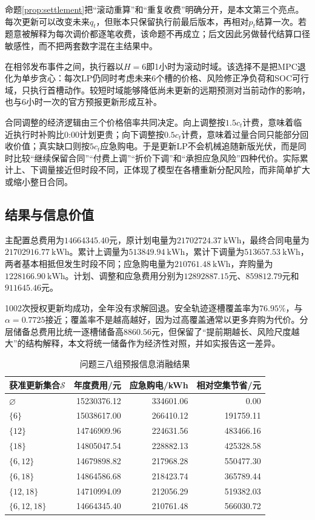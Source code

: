 \documentclass[UTF8,12pt,a4paper]{ctexart}
\theoremstyle{remark}
\begin{document}
命题\ref{prop:settlement}把“滚动重算”和“重复收费”明确分开，是本文第三个亮点。每次更新可以改变未来$q_t$，但账本只保留执行前最后版本，再相对$p_t$结算一次。若题意被解释为每次调价都逐笔收费，该命题不再成立；后文因此另做替代结算口径敏感性，而不把两套数字混在主结果中。

在相邻发布事件之间，执行器以$H=6$即1小时为滚动时域。该选择不是把MPC退化为单步贪心：每次LP仍同时考虑未来6个槽的价格、风险修正净负荷和SOC可行域，只执行首槽动作。较短时域能够降低尚未更新的远期预测对当前动作的影响，也与6小时一次的官方预报更新形成互补。

合同调整的经济逻辑由三个价格倍率共同决定。向上调整按$1.5c_t$计费，意味着临近执行时补购比0:00计划更贵；向下调整按$0.5c_t$计费，意味着过量合同只能部分回收价值；真实缺口则按$5c_t$应急购电。于是更新LP不会机械追随新版光伏，而是同时比较“继续保留合同”“付费上调”“折价下调”和“承担应急风险”四种代价。实际累计上、下调量接近但时段不同，正体现了模型在各槽重新分配风险，而非简单扩大或缩小整日合同。

\subsection{结果与信息价值}
主配置总费用为$14664345.40$元，原计划电量为$21702724.37\ \mathrm{kWh}$，最终合同电量为$21702916.77\ \mathrm{kWh}$。累计上调量为$513849.94\ \mathrm{kWh}$，累计下调量为$513657.53\ \mathrm{kWh}$，两者基本相抵但发生时段不同；应急购电量为$210761.48\ \mathrm{kWh}$，弃购量为$1228166.90\ \mathrm{kWh}$。计划、调整和应急费用分别为$12892887.15$元、$859812.79$元和$911645.46$元。

1002次授权更新均成功，全年没有求解回退。安全轨迹逐槽覆盖率为$76.95\%$，与$\alpha=0.7725$接近；覆盖率不是越高越好，因为过高覆盖通常以更多弃购为代价。分层储备总费用比统一逐槽储备高$8860.56$元，但保留了“提前期越长、风险尺度越大”的结构解释，本文将统一储备作为经济性对照，并如实报告这一差异。

\begin{table}[H]\centering\small
\caption{问题三八组预报信息消融结果}\label{tab:q3-ablation}
\begin{tabular}{lrrr}\toprule
获准更新集合$\mathcal S$&年度费用/元&应急购电/kWh&相对空集节省/元\\\midrule
$\varnothing$&15230376.12&334601.06&0.00\\
$\{6\}$&15038617.00&266410.12&191759.11\\
$\{12\}$&14746909.96&224631.56&483466.16\\
$\{18\}$&14805047.54&228882.13&425328.58\\
$\{6,12\}$&14679898.82&217968.28&550477.30\\
$\{6,18\}$&14864586.68&218423.74&365789.44\\
$\{12,18\}$&14710994.09&212056.29&519382.03\\
$\{6,12,18\}$&14664345.40&210761.48&566030.72\\\bottomrule
\end{tabular}
\end{table}
\end{document}

